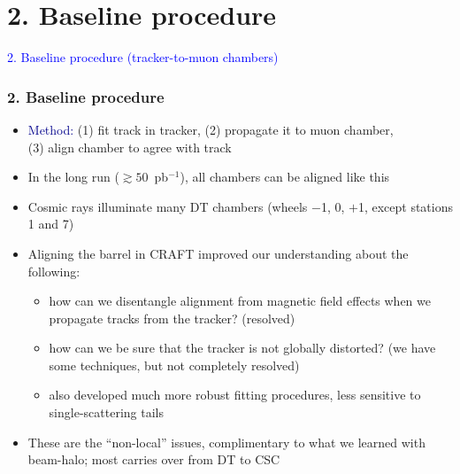 \documentclass[compress]{beamer}
\begin{document}
\section*{2. Baseline procedure}
\begin{frame}
\begin{center}
\Huge \textcolor{blue}{2. Baseline procedure (tracker-to-muon chambers)}
\end{center}
\end{frame}

\begin{frame}
\frametitle{2. Baseline procedure}
\begin{itemize}\setlength{\itemsep}{0.15 cm}
\item \textcolor{darkblue}{Method:} {\scriptsize (1)} fit track in tracker, {\scriptsize (2)} propagate it to muon chamber, \\ {\scriptsize (3)} align chamber to agree with track
\item In the long run ($\gtrsim 50$~pb$^{-1}$), all chambers can be aligned like this
\item Cosmic rays illuminate many DT chambers (wheels $-$1, 0, $+$1, except stations 1 and 7)
\item Aligning the barrel in CRAFT improved our understanding about the following:
\begin{itemize}
\item how can we disentangle alignment from magnetic field effects when we propagate tracks from the tracker? {\scriptsize (resolved)}
\item how can we be sure that the tracker is not globally distorted? {\scriptsize (we have some techniques, but not completely resolved)}
\item also developed much more robust fitting procedures, less sensitive to single-scattering tails
\end{itemize}
\item These are the ``non-local'' issues, complimentary to what we learned with beam-halo; most carries over from DT to CSC
\end{itemize}
\end{frame}
\end{document}
